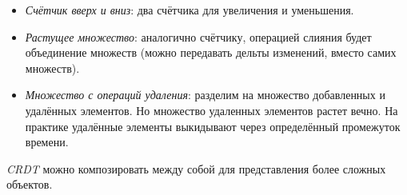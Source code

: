 \begin{examples}
    \begin{itemize}
        \item \textit{Счётчик вверх и вниз}: два счётчика для увеличения и уменьшения.
        \item \textit{Растущее множество}: аналогично счётчику, операцией слияния будет
            объединение множеств (можно передавать дельты изменений, вместо самих множеств).
        \item \textit{Множество с операций удаления}: разделим на множество добавленных и
            удалённых элементов. Но множество удаленных элементов растет вечно. На практике
            удалённые элементы выкидывают через определённый промежуток времени.
    \end{itemize}
\end{examples}

\begin{remark}
    \textit{CRDT} можно композировать между собой для представления более сложных объектов.
\end{remark}
